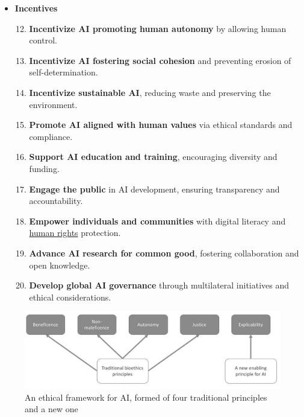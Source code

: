\begin{itemize}
    \item \textbf{Incentives}
    \begin{enumerate}[label*=\arabic*.]
        \setcounter{enumi}{11}
        \item \textbf{Incentivize AI promoting human autonomy} by allowing human control.
        \item \textbf{Incentivize AI fostering social cohesion} and preventing erosion of self-determination.
        \item \textbf{Incentivize sustainable AI}, reducing waste and preserving the environment.
        \item \textbf{Promote AI aligned with human values} via ethical standards and compliance.
        \item \textbf{Support AI education and training}, encouraging diversity and funding.
        \item \textbf{Engage the public} in AI development, ensuring transparency and accountability.
        \item \textbf{Empower individuals and communities} with digital literacy and \hyperref[sec:AIHumanRights]{human rights} protection.
        \item \textbf{Advance AI research for common good}, fostering collaboration and open knowledge.
        \item \textbf{Develop global AI governance} through multilateral initiatives and ethical considerations.
    \end{enumerate}
\end{itemize}

\begin{figure}[h]
    \centering
    \includegraphics[width=0.75\linewidth]{Assets/AI Framework.png}
    \caption{An ethical framework for AI, formed of four traditional principles and a new one}
\end{figure}